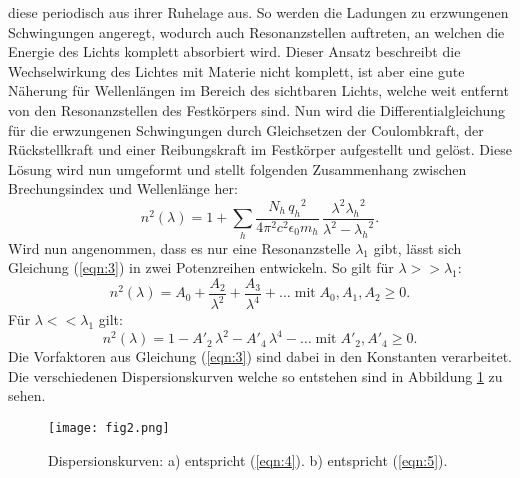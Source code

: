 diese periodisch aus ihrer Ruhelage aus. So werden die Ladungen zu erzwungenen Schwingungen angeregt, wodurch auch Resonanzstellen auftreten, an welchen
die Energie des Lichts komplett absorbiert wird. Dieser Ansatz beschreibt die Wechselwirkung des Lichtes mit Materie nicht komplett, ist aber eine gute
Näherung für Wellenlängen im Bereich des sichtbaren Lichts, welche weit entfernt von den Resonanzstellen des Festkörpers sind. Nun wird die Differentialgleichung
für die erwzungenen Schwingungen durch Gleichsetzen der Coulombkraft, der Rückstellkraft und einer Reibungskraft im Festkörper aufgestellt und gelöst. Diese Lösung
wird nun umgeformt und stellt folgenden Zusammenhang zwischen Brechungsindex und Wellenlänge her:
\begin{equation}
  n^2 (\lambda) = 1 + \sum_h \frac{N_h \, {q_h}^2}{4 {\pi}^2 c^2 {\epsilon}_0 m_h} \, \frac{{\lambda}^2 {{\lambda}_h}^2}{{\lambda}^2 - {{\lambda}_h}^2} .
  \label{eqn:3}
\end{equation}
Wird nun angenommen, dass es nur eine Resonanzstelle ${\lambda}_1$ gibt, lässt sich Gleichung (\ref{eqn:3}) in zwei Potenzreihen entwickeln. So gilt für
$\lambda >> {\lambda}_1$:
\begin{equation}
n^2 (\lambda) = A_0 + \frac{A_2}{{\lambda}^2} + \frac{A_3}{{\lambda}^4} + \ldots \; \text{mit} \; A_0 , A_1 , A_2 \geq 0 .
\label{eqn:4}
\end{equation}
Für $\lambda << {\lambda}_1$ gilt:
\begin{equation}
n^2 (\lambda) = 1 - {A'}_2 \, {\lambda}^2 - {A'}_4 \, {\lambda}^4 - \ldots \; \text{mit} \; {A'}_2 , {A'}_4 \geq 0 .
\label{eqn:5}
\end{equation}
Die Vorfaktoren aus Gleichung (\ref{eqn:3}) sind dabei in den Konstanten verarbeitet.
Die verschiedenen Dispersionskurven welche so entstehen sind in Abbildung \ref{fig:2} zu sehen.
\begin{figure}
  \centering
  \texttt{[image: fig2.png]}
  \caption{Dispersionskurven: a) entspricht (\ref{eqn:4}). b) entspricht (\ref{eqn:5}). \cite{1}}
  \label{fig:2}
\end{figure}
